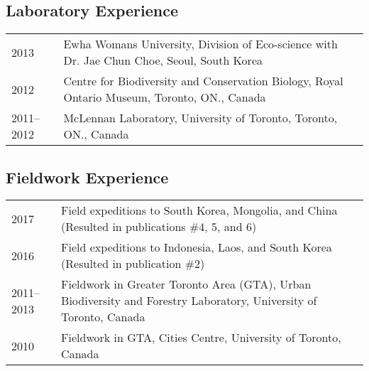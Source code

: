 \documentclass[11pt]{article}
\begin{document}
\subsection*{Laboratory Experience}
\begin{longtable}{p{}  p{}}
2013 &	Ewha Womans University, Division of Eco-science with Dr. Jae Chun Choe, Seoul, South Korea\\%
2012 &	Centre for Biodiversity and Conservation Biology, Royal Ontario Museum, Toronto, ON., Canada\\
2011--2012 &	McLennan Laboratory, University of Toronto, Toronto, ON., Canada\vspace{5pt}\\
\end{longtable}


\subsection*{Fieldwork Experience}
\begin{longtable}{p{}  p{}}
2017 & Field expeditions to South Korea, Mongolia, and China (Resulted in publications \#4, 5, and 6)\\
2016 & Field expeditions to Indonesia, Laos, and South Korea (Resulted in publication \#2)\\
2011--2013 & Fieldwork in Greater Toronto Area (GTA), Urban Biodiversity and Forestry Laboratory, University of Toronto, Canada\\
2010 & Fieldwork in GTA, Cities Centre, University of Toronto, Canada\vspace{5pt}\\%
\end{longtable}
\end{document}
